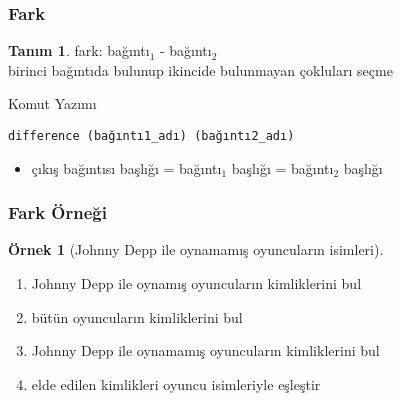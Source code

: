 \documentclass[dvipsnames]{beamer}
\theoremstyle{definition}
\newtheorem{tanim}[theorem]{Tanım}
\theoremstyle{example}
\newtheorem{ornek}[theorem]{Örnek}
\theoremstyle{plain}
\begin{document}
\begin{frame}[fragile]
  \frametitle{Fark}

  \begin{tanim}
    \alert{fark}: bağıntı$_1$ - bağıntı$_2$\\
      birinci bağıntıda bulunup ikincide bulunmayan çokluları seçme
  \end{tanim}

  \pause
  \begin{block}{Komut Yazımı}
    \begin{lstlisting}
difference (bağıntı1_adı) (bağıntı2_adı)
    \end{lstlisting}
  \end{block}

  \pause
  \begin{itemize}
    \item çıkış bağıntısı başlığı = bağıntı$_1$ başlığı = bağıntı$_2$ başlığı
  \end{itemize}
\end{frame}

\begin{frame}
  \frametitle{Fark Örneği}

  \begin{ornek}[Johnny Depp ile oynamamış oyuncuların isimleri]
    \pause
    \begin{enumerate}
      \item Johnny Depp ile oynamış oyuncuların kimliklerini bul

      \pause
      \item bütün oyuncuların kimliklerini bul

      \pause
      \item Johnny Depp ile oynamamış oyuncuların kimliklerini bul

      \pause
      \item elde edilen kimlikleri oyuncu isimleriyle eşleştir
    \end{enumerate}
  \end{ornek}
\end{frame}
\end{document}
